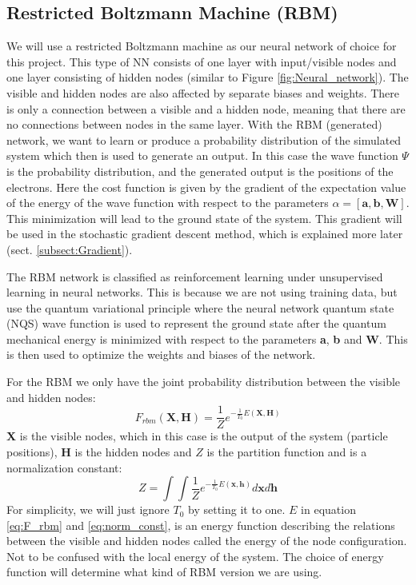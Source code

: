 \documentclass[12pt,a4paper,english]{article}
\begin{document}
\subsection{Restricted Boltzmann Machine (RBM)}
\label{subsect:RBM}
We will use a restricted Boltzmann machine as our neural network of choice for this project. This type of NN consists of one layer with input/visible nodes and one layer consisting of hidden nodes (similar to Figure \ref{fig:Neural_network}). The visible and hidden nodes are also affected by separate biases and weights. There is only a connection between a visible and a hidden node, meaning that there are no connections between nodes in the same layer. With the RBM (generated) network, we want to learn or produce a probability distribution of the simulated system which then is used to generate an output. In this case the wave function $\Psi$ is the probability distribution, and the generated output is the positions of the electrons. Here the cost function is given by the gradient of the expectation value of the energy of the wave function with respect to the parameters $\alpha=[\textbf{a}, \textbf{b}, \textbf{W}]$. This minimization will lead to the ground state of the system. This gradient will be used in the stochastic gradient descent method, which is explained more later (sect. \ref{subsect:Gradient}).

The RBM network is classified as reinforcement learning under unsupervised learning in neural networks. This is because we are not using training data, but use the quantum variational principle where the neural network quantum state (NQS) wave function is used to represent the ground state after the quantum mechanical energy is minimized with respect to the parameters \textbf{a}, \textbf{b} and \textbf{W}. This is then used to optimize the weights and biases of the network. 

For the RBM we only have the joint probability distribution between the visible and hidden nodes:
\begin{equation}
\label{eq:F_rbm}
F_{rbm}(\textbf{X}, \textbf{H})=\frac{1}{Z}e^{-\frac{1}{T_0}E(\textbf{X},\textbf{H})}
\end{equation}
\textbf{X} is the visible nodes, which in this case is the output of the system (particle positions), \textbf{H} is the hidden nodes and $Z$ is the partition function and is a normalization constant:
\begin{equation}
\label{eq:norm_const}
Z=\int\int \frac{1}{Z}e^{-\frac{1}{T_0}E(\textbf{x},\textbf{h})}d\textbf{x}d\textbf{h}
\end{equation}
For simplicity, we will just ignore $T_0$ by setting it to one. $E$ in equation \ref{eq:F_rbm} and \ref{eq:norm_const}, is an energy function describing the relations between the visible and hidden nodes called the energy of the node configuration. Not to be confused with the local energy of the system. The choice of energy function will determine what kind of RBM version we are using. 
\end{document}
